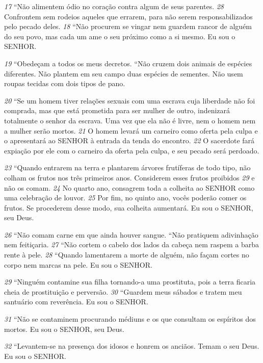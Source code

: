 \smallskip
\textit{\tiny 17}
“Não alimentem ódio no coração contra algum de seus parentes.
\textit{\tiny 28}
Confrontem sem rodeios aqueles que errarem, para não serem responsabilizados
pelo pecado deles.
\textit{\tiny 18}
“Não procurem se vingar nem guardem rancor de alguém do seu povo, mas
cada um ame o seu próximo como a si mesmo. Eu sou o SENHOR.
   
\smallskip
\textit{\tiny 19}
“Obedeçam a todos os meus decretos.
   “Não cruzem dois animais de espécies diferentes. Não plantem em seu campo
duas espécies de sementes. Não usem roupas tecidas com dois tipos de pano.
  
\smallskip
\textit{\tiny 20}
“Se um homem tiver relações sexuais com uma escrava cuja liberdade não foi
comprada, mas que está prometida para ser mulher de outro, indenizará
totalmente o senhor da escrava. Uma vez que ela não é livre, nem o homem nem a
mulher serão mortos. 
\textit{\tiny 21}
O homem levará um carneiro como oferta pela culpa e o
apresentará ao SENHOR à entrada da tenda do encontro. 
\textit{\tiny 22}
O sacerdote fará
expiação por ele com o carneiro da oferta pela culpa, e seu pecado será perdoado.
   
\bigskip 
\textit{\tiny 23}
“Quando entrarem na terra e plantarem árvores frutíferas de todo tipo, não
colham os frutos nos três primeiros anos. Considerem esses frutos proibidos
\textit{\tiny 29}
 e
não os comam. 
\textit{\tiny 24}
No quarto ano, consagrem toda a colheita ao SENHOR como uma
celebração de louvor. 
\textit{\tiny 25}
Por fim, no quinto ano, vocês poderão comer os frutos. Se
procederem desse modo, sua colheita aumentará. Eu sou o SENHOR, seu Deus.
   
\smallskip
\textit{\tiny 26}
“Não comam carne em que ainda houver sangue.
   “Não pratiquem adivinhação nem feitiçaria.
\textit{\tiny 27}
“Não cortem o cabelo dos lados da cabeça nem raspem a barba rente à pele.
\textit{\tiny 28}
“Quando lamentarem a morte de alguém, não façam cortes no corpo nem
marcas na pele. Eu sou o SENHOR.
   
\smallskip
\textit{\tiny 29}
“Ninguém contamine sua filha tornando-a uma prostituta, pois a terra ficaria
cheia de prostituição e perversão.
\textit{\tiny 30}
“Guardem meus sábados e tratem meu santuário com reverência. Eu sou o
SENHOR.
   
\smallskip
\textit{\tiny 31}
“Não se contaminem procurando médiuns e os que consultam os espíritos
dos mortos. Eu sou o SENHOR, seu Deus.
   
\smallskip
\textit{\tiny 32}
“Levantem-se na presença dos idosos e honrem os anciãos. Temam o seu
Deus. Eu sou o SENHOR.
   
